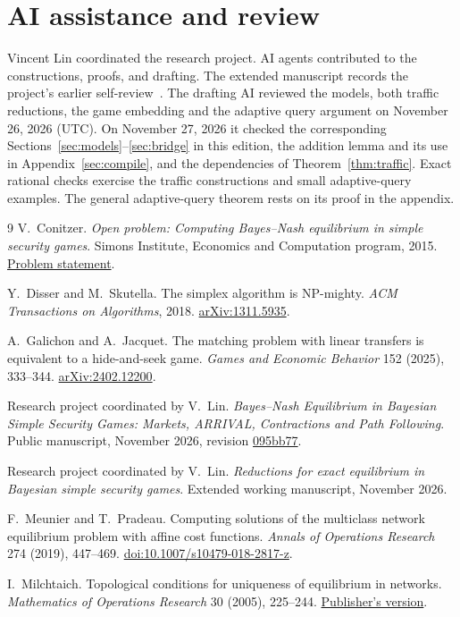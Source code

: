 \documentclass[11pt]{article}
\begin{document}
\section*{AI assistance and review}
Vincent Lin coordinated the research project. AI agents contributed to the
constructions, proofs, and drafting. The extended manuscript records the
project's earlier self-review~\cite{extended}. The drafting AI reviewed
the models, both traffic reductions, the game embedding and the adaptive
query argument on November 26, 2026 (UTC). On November 27, 2026 it checked
the corresponding Sections~\ref{sec:models}--\ref{sec:bridge} in this
edition, the addition lemma and its use in Appendix~\ref{sec:compile},
and the dependencies of Theorem~\ref{thm:traffic}. Exact rational checks
exercise the traffic constructions and small adaptive-query examples.
The general adaptive-query theorem rests on its proof in the appendix.

\begin{thebibliography}{9}
V.~Conitzer. \emph{Open problem: Computing Bayes--Nash equilibrium in simple
security games}. Simons Institute, Economics and Computation program, 2015.
\href{https://www.cs.cmu.edu/~conitzer/security_game_open_problem_simons.pdf}{Problem statement}.

Y.~Disser and M.~Skutella. The simplex algorithm is NP-mighty.
\emph{ACM Transactions on Algorithms}, 2018.
\href{https://arxiv.org/abs/1311.5935}{arXiv:1311.5935}.

A.~Galichon and A.~Jacquet. The matching problem with linear transfers is
equivalent to a hide-and-seek game. \emph{Games and Economic Behavior}
152 (2025), 333--344.
\href{https://arxiv.org/abs/2402.12200}{arXiv:2402.12200}.

Research project coordinated by V.~Lin. \emph{Bayes--Nash Equilibrium in
Bayesian Simple Security Games: Markets, ARRIVAL, Contractions and Path
Following}. Public manuscript, November 2026, revision
\href{https://github.com/vvncent/bayes-nash-equilibrium-simple-security-games/blob/095bb77fb6f15406d01f1ed2c8cb8038328f100b/main.pdf}{095bb77}.

Research project coordinated by V.~Lin. \emph{Reductions for exact equilibrium
in Bayesian simple security games}. Extended working manuscript, November 2026.

F.~Meunier and T.~Pradeau. Computing solutions of the multiclass network
equilibrium problem with affine cost functions.
\emph{Annals of Operations Research} 274 (2019), 447--469.
\href{https://doi.org/10.1007/s10479-018-2817-z}{doi:10.1007/s10479-018-2817-z}.

I.~Milchtaich. Topological conditions for uniqueness of equilibrium in
networks. \emph{Mathematics of Operations Research} 30 (2005), 225--244.
\href{https://doi.org/10.1287/moor.1040.0122}{Publisher's version}.
\end{thebibliography}
\end{document}
